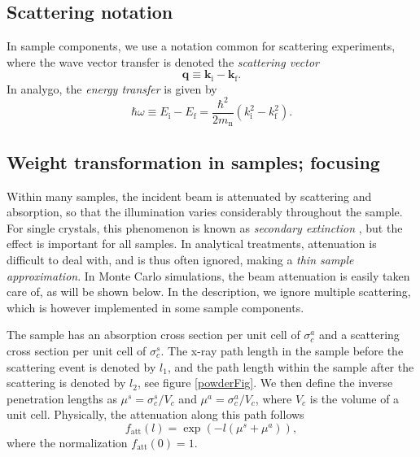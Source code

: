 \subsection{Scattering notation}
In sample components, we use a notation common for scattering experiments,
where the wave vector transfer is denoted the {\em scattering vector}
\begin{equation} \label{eq:q-transfer}
\boldsymbol{q} \equiv \boldsymbol{k}_\mathrm{i} - \boldsymbol{k}_\mathrm{f} .
\end{equation}
In analygo, the {\em energy transfer} is given by
\begin{equation} \label{eq:w-transfer}
\hbar \omega \equiv E_\mathrm{i} - E_\mathrm{f} =
\frac{\hbar^2}{2 m_\mathrm{n}} \left( k_\mathrm{i}^2 - k_\mathrm{f}^2 \right) .
\end{equation}

\subsection{Weight transformation in samples; focusing}

Within many samples,
the incident beam is attenuated by scattering and absorption,
so that the illumination varies considerably throughout the sample.
For single crystals, this phenomenon is known as
{\em secondary extinction} \cite{bacon}, but the effect is
important for all samples.
In analytical treatments, attenuation is difficult to deal with,
and is thus often ignored, making a {\em thin sample approximation}.
In Monte Carlo simulations, the beam attenuation
is easily taken care of, as will be shown below.
In the description, we ignore multiple scattering, which is however
 implemented in some sample components.

The sample has an absorption cross section per unit cell of
$\sigma_c^a$ and a scattering cross section per unit cell
of $\sigma_c^s$. The x-ray path length
in the sample before the scattering event is denoted by $l_1$, and
the path length within the sample after the scattering
is denoted by $l_2$, see figure \ref{powderFig}.
We then define the inverse penetration lengths as
$\mu^s = \sigma_c^s / V_c$ and $\mu^a = \sigma_c^a / V_c$, where
$V_c$ is the volume of a unit cell. Physically, the attenuation
along this path follows
\begin{equation}
f_\mathrm{att}(l) = \exp(- l (\mu^s + \mu^a)) ,
\end{equation}
where the normalization $f_\mathrm{att}(0)=1$.

